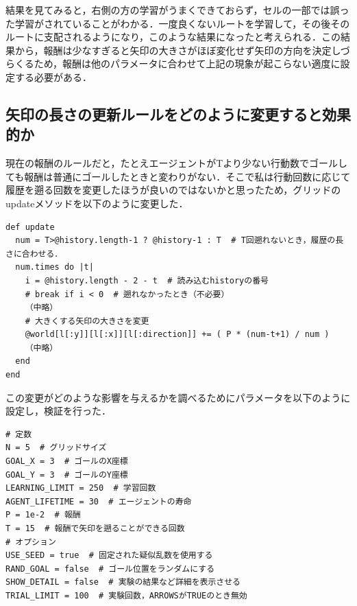 \documentclass[a4j,11pt]{jarticle}
\begin{document}
結果を見てみると，右側の方の学習がうまくできておらず，セルの一部では誤った学習がされていることがわかる．一度良くないルートを学習して，その後そのルートに支配されるようになり，このような結果になったと考えられる．この結果から，報酬は少なすぎると矢印の大きさがほぼ変化せず矢印の方向を決定しづらくるため，報酬は他のパラメータに合わせて上記の現象が起こらない適度に設定する必要がある．

\newpage

\subsection{矢印の長さの更新ルールをどのように変更すると効果的か}


現在の報酬のルールだと，たとえエージェントがTより少ない行動数でゴールしても報酬は普通にゴールしたときと変わりがない．そこで私は行動回数に応じて履歴を遡る回数を変更したほうが良いのではないかと思ったため，グリッドのupdateメソッドを以下のように変更した．

\begin{verbatim}
def update
  num = T>@history.length-1 ? @history-1 : T  # T回遡れないとき，履歴の長さに合わせる．
  num.times do |t|
    i = @history.length - 2 - t  # 読み込むhistoryの番号
    # break if i < 0  # 遡れなかったとき（不必要）
    （中略）
    # 大きくする矢印の大きさを変更
    @world[l[:y]][l[:x]][l[:direction]] += ( P * (num-t+1) / num )
    （中略）
  end
end
\end{verbatim}

この変更がどのような影響を与えるかを調べるためにパラメータを以下のように設定し，検証を行った．

\begin{verbatim}
# 定数
N = 5  # グリッドサイズ
GOAL_X = 3  # ゴールのX座標
GOAL_Y = 3  # ゴールのY座標
LEARNING_LIMIT = 250  # 学習回数
AGENT_LIFETIME = 30  # エージェントの寿命
P = 1e-2  # 報酬
T = 15  # 報酬で矢印を遡ることができる回数
# オプション
USE_SEED = true  # 固定された疑似乱数を使用する
RAND_GOAL = false  # ゴール位置をランダムにする
SHOW_DETAIL = false  # 実験の結果など詳細を表示させる
TRIAL_LIMIT = 100  # 実験回数，ARROWSがTRUEのとき無効
\end{verbatim}
\end{document}
